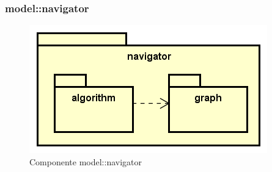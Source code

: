 \documentclass[../DefinizioneDiProdotto.tex]{subfiles}
\begin{document}
\subsubsection{model::\-navigator}

\begin{figure}[H]
	\centering
	\includegraphics[width=\maxwidth]{img/package/navigator.png}
	\caption{Componente model::\-navigator}\label{fig:model::navigator} 
\end{figure}
\end{document}
